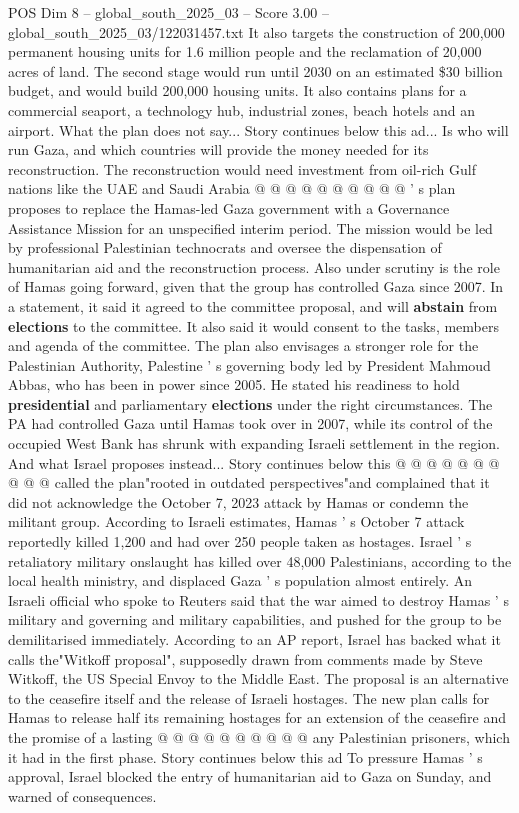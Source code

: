 \begin{textsample}{POS Dim 8 – global\_south\_2025\_03 – Score 3.00 – global\_south\_2025\_03/122031457.txt}
It also targets the construction of 200,000 permanent housing units for 1.6 million people and the reclamation of 20,000 acres of land.
The second stage would run until 2030 on an estimated \$30 billion budget, and would build 200,000 housing units.
It also contains plans for a commercial seaport, a technology hub, industrial zones, beach hotels and an airport.
What the plan does not say...
Story continues below this ad...
Is who will run Gaza, and which countries will provide the money needed for its reconstruction.
The reconstruction would need investment from oil-rich Gulf nations like the UAE and Saudi Arabia @ @ @ @ @ @ @ @ @ @ ' s plan proposes to replace the Hamas-led Gaza government with a Governance Assistance Mission for an unspecified interim period.
The mission would be led by professional Palestinian technocrats and oversee the dispensation of humanitarian aid and the reconstruction process.
Also under scrutiny is the role of Hamas going forward, given that the group has controlled Gaza since 2007.
In a statement, it said it agreed to the committee proposal, and will \textbf{abstain} from \textbf{elections} to the committee.
It also said it would consent to the tasks, members and agenda of the committee.
The plan also envisages a stronger role for the Palestinian Authority, Palestine ' s governing body led by President Mahmoud Abbas, who has been in power since 2005.
He stated his readiness to hold \textbf{presidential} and parliamentary \textbf{elections} under the right circumstances.
The PA had controlled Gaza until Hamas took over in 2007, while its control of the occupied West Bank has shrunk with expanding Israeli settlement in the region.
And what Israel proposes instead...
Story continues below this @ @ @ @ @ @ @ @ @ @ called the plan"rooted in outdated perspectives"and complained that it did not acknowledge the October 7, 2023 attack by Hamas or condemn the militant group.
According to Israeli estimates, Hamas ' s October 7 attack reportedly killed 1,200 and had over 250 people taken as hostages.
Israel ' s retaliatory military onslaught has killed over 48,000 Palestinians, according to the local health ministry, and displaced Gaza ' s population almost entirely.
An Israeli official who spoke to Reuters said that the war aimed to destroy Hamas ' s military and governing and military capabilities, and pushed for the group to be demilitarised immediately.
According to an AP report, Israel has backed what it calls the"Witkoff proposal", supposedly drawn from comments made by Steve Witkoff, the US Special Envoy to the Middle East.
The proposal is an alternative to the ceasefire itself and the release of Israeli hostages.
The new plan calls for Hamas to release half its remaining hostages for an extension of the ceasefire and the promise of a lasting @ @ @ @ @ @ @ @ @ @ any Palestinian prisoners, which it had in the first phase.
Story continues below this ad To pressure Hamas ' s approval, Israel blocked the entry of humanitarian aid to Gaza on Sunday, and warned of consequences.

\end{textsample}
